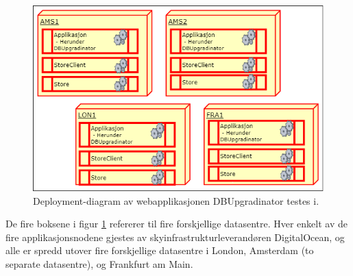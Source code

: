 \begin{figure}[!ht]
    \centering
    \includegraphics[scale=0.6]{fig/dbupgradinator-physical.png}
    \caption{Deployment-diagram av webapplikasjonen DBUpgradinator testes i.}
    \label{fig10}
\end{figure}

De fire boksene i figur \ref{fig10} refererer til fire forskjellige datasentre. Hver enkelt av de fire applikasjonsnodene gjestes av skyinfrastrukturleverandøren DigitalOcean, og alle er spredd utover fire forskjellige datasentre i London, Amsterdam (to separate datasentre), og Frankfurt am Main.
